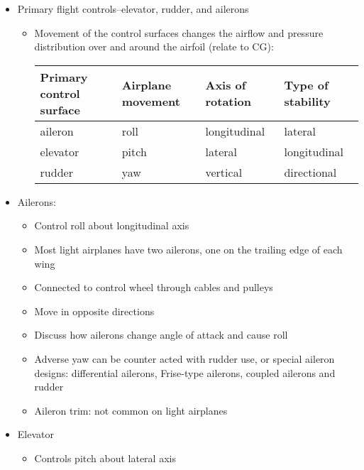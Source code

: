 \documentclass[twoside,openright]{report}
\begin{document}
\begin{itemize}
  \item Primary flight controls--elevator, rudder, and ailerons
    \begin{itemize}
      \item Movement of the control surfaces changes the airflow and pressure
        distribution over and around the airfoil (relate to CG):
\begin{table}[h]
\centering
\begin{tabular}{l|l|l|l}
Primary control surface & Airplane movement & Axis of rotation & Type of stability \\\hline
aileron                 & roll              & longitudinal     & lateral           \\
elevator                & pitch             & lateral          & longitudinal      \\
rudder                  & yaw               & vertical         & directional
\end{tabular}
\end{table}
    \end{itemize}
  \item Ailerons:
    \begin{itemize}
      \item Control roll about longitudinal axis

      \item Most light airplanes have two ailerons, one on the trailing edge of
        each wing

      \item Connected to control wheel through cables and pulleys

      \item Move in opposite directions

      \item Discuss how ailerons change angle of attack and cause roll

      \item Adverse yaw can be counter acted with rudder use, or special
        aileron designs: differential ailerons, Frise-type ailerons, coupled
        ailerons and rudder

      \item Aileron trim: not common on light airplanes
    \end{itemize}
  \item Elevator
    \begin{itemize}
      \item Controls pitch about lateral axis


\end{itemize}
\end{itemize}
\end{document}
